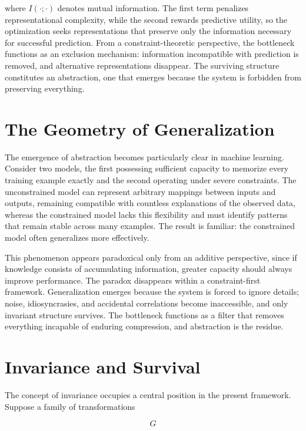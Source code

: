 \documentclass[11pt,oneside]{book}
\theoremstyle{plain}
\theoremstyle{definition}
\theoremstyle{remark}
\begin{document}
where \(I(\cdot;\cdot)\) denotes mutual information. The first term penalizes representational complexity, while the second rewards predictive utility, so the optimization seeks representations that preserve only the information necessary for successful prediction. From a constraint-theoretic perspective, the bottleneck functions as an exclusion mechanism: information incompatible with prediction is removed, and alternative representations disappear. The surviving structure constitutes an abstraction, one that emerges because the system is forbidden from preserving everything.

\section{The Geometry of Generalization}

The emergence of abstraction becomes particularly clear in machine learning. Consider two models, the first possessing sufficient capacity to memorize every training example exactly and the second operating under severe constraints. The unconstrained model can represent arbitrary mappings between inputs and outputs, remaining compatible with countless explanations of the observed data, whereas the constrained model lacks this flexibility and must identify patterns that remain stable across many examples. The result is familiar: the constrained model often generalizes more effectively.

This phenomenon appears paradoxical only from an additive perspective, since if knowledge consists of accumulating information, greater capacity should always improve performance. The paradox disappears within a constraint-first framework. Generalization emerges because the system is forced to ignore details; noise, idiosyncrasies, and accidental correlations become inaccessible, and only invariant structure survives. The bottleneck functions as a filter that removes everything incapable of enduring compression, and abstraction is the residue.

\section{Invariance and Survival}

The concept of invariance occupies a central position in the present framework. Suppose a family of transformations

\begin{equation}
G
\end{equation}
\end{document}

